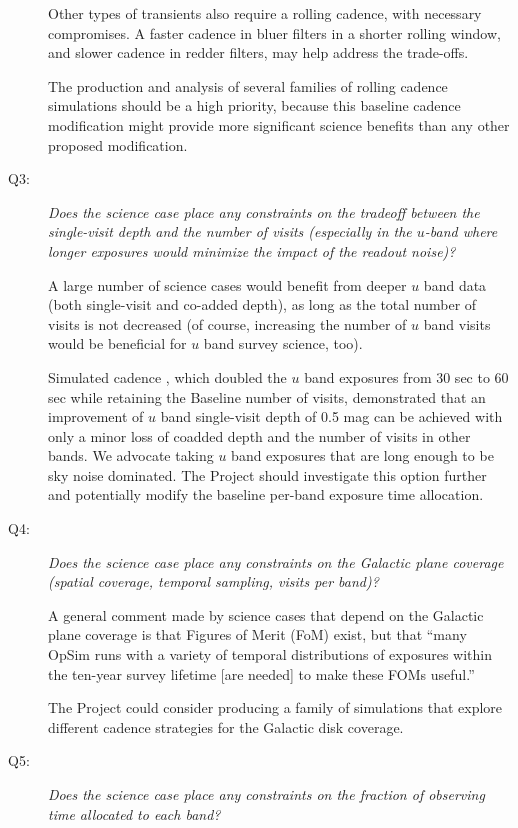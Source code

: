 \begin{description}
Other types of transients also require a rolling cadence, with necessary compromises.  A faster cadence in
bluer filters in a shorter rolling window, and slower cadence in redder filters, may help address the
trade-offs.

The production and analysis of several families of rolling cadence
simulations should be a high priority, because this
baseline cadence modification might provide more significant science
benefits than any other proposed modification.


\item[Q3:] {\it Does the science case place any constraints on the
tradeoff between the single-visit depth and the number of visits
(especially in the $u$-band where longer exposures would minimize the
impact of the readout noise)?}


A large number of science cases would benefit from deeper $u$ band data
(both single-visit and co-added depth), as long as the total number of visits
is not decreased (of course, increasing the number of $u$ band visits
would be beneficial for $u$ band survey science, too).

Simulated cadence , which
doubled the $u$ band exposures from 30 sec to 60 sec while retaining the Baseline number of visits, demonstrated that an
improvement of $u$ band single-visit depth of 0.5 mag can be achieved
with only a minor loss of coadded depth and the number of visits in other bands.
We advocate taking $u$ band exposures that are long enough to be sky noise dominated.
The Project should investigate this option further and potentially
modify the baseline per-band exposure time allocation.


\item[Q4:] {\it Does the science case place any constraints on the
Galactic plane coverage (spatial coverage, temporal sampling, visits per
band)?}

A general comment made by science cases that depend on the Galactic
plane coverage is that Figures of Merit (FoM) exist, but that ``many
OpSim runs with a variety of temporal distributions of exposures within
the ten-year survey lifetime [are needed] to make these FOMs useful.''

The Project could consider producing a family of simulations that explore
different cadence strategies for the Galactic disk coverage.


\item[Q5:] {\it Does the science case place any constraints on the
fraction of observing time allocated to each band?}


\end{description}
